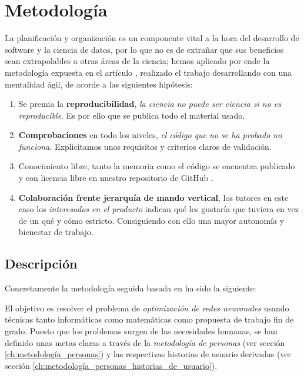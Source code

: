 %

\chapter{Metodología}

La planificación y organización es un componente vital a la hora del desarrollo de software 
y la ciencia de datos, por lo que no es de extrañar que sus beneficios sean extrapolables
a otras áreas de la ciencia; 
hemos aplicado por ende la 
metodología expuesta en el artículo \cite{DBLP:journals/corr/abs-2104-12545}, realizado 
el trabajo desarrollando con una mentalidad ágil, de acorde a las siguientes hipótesis: 

\begin{enumerate}
    \item Se premia la \textbf{reproducibilidad}, \textit{la ciencia no puede ser ciencia si no es reproducible}. Es por 
    ello que se publica todo el material usado. 
    \item \textbf{Comprobaciones} en todo los niveles, \textit{el código que no se ha probado no funciona}. 
    Explicitamos unos requisitos y criterios claros de validación. 
    \item Conocimiento libre, tanto la memoria como el código se encuentra publicado y con licencia libre en nuestro repositorio 
    de GitHub \cite{TFG-Estudio-de-las-redes-neuronales}.
    \item \textbf{Colaboración frente jerarquía de mando vertical}, los tutores en este caso 
    los \textit{interesados en el producto} 
    indican qué les gustaría que tuviera en vez de un qué y cómo estricto. Consiguiendo con ello una mayor autonomía y bienestar de trabajo.
     
\end{enumerate}  

\section{Descripción}  

Concretamente la metodología seguida basada en \cite{que-es-un-trabajo-fin-de-x} ha sido la siguiente: 

El objetivo es resolver el problema 
de \textit{optimización de redes neuronales}
usando técnicas tanto informáticas como matemáticas
como propuesta de trabajo fin de grado. 
Puesto que los problemas surgen de las necesidades humanas,
se han definido unas metas claras a través de la \textit{metodología de personas} 
(ver sección \ref{ch:metodología_personas}) \cite{personas-why-and-how-you-should-use-them}
y las respectivas historias de usuario derivadas (ver sección \ref{ch:metodología_personas_historias_de_usuario}).   


